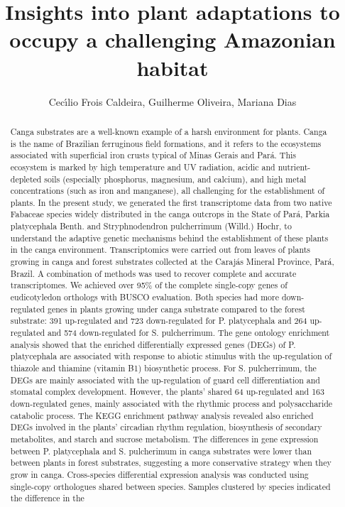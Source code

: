 \documentclass[twoside]{article}
\title{\vspace{-15mm}\fontsize{24pt}{10pt}\selectfont\textbf{ Insights into plant adaptations to occupy a challenging Amazonian habitat }} %
\author{ Cec\'{\i}lio Frois Caldeira,  Guilherme Oliveira,  Mariana Dias }
\affil{ ITV - Instituto Tecnol\'ogico Vale,  UFMG/ITV }
\date{}
\begin{document}
  
  
  \maketitle %
  
  
  \thispagestyle{fancy} %
  
  
  \begin{abstract}
  Canga substrates are a well-known example of a harsh environment for plants. Canga is the name of Brazilian ferruginous field formations,  and it refers to the ecosystems associated with superficial iron crusts typical of Minas Gerais and Par\'a. This ecosystem is marked by high temperature and UV radiation,  acidic and nutrient-depleted soils (especially phosphorus,  magnesium,  and calcium),  and high metal concentrations (such as iron and manganese),  all challenging for the establishment of plants. In the present study,  we generated the first transcriptome data from two native Fabaceae species widely distributed in the canga outcrops in the State of Par\'a,  Parkia platycephala Benth. and Stryphnodendron pulcherrimum (Willd.) Hochr,  to understand the adaptive genetic mechanisms behind the establishment of these plants in the canga environment. Transcriptomics were carried out from leaves of plants growing in canga and forest substrates collected at the Caraj\'as Mineral Province,  Par\'a,  Brazil. A combination of methods was used to recover complete and accurate transcriptomes. We achieved over 95\% of the complete single-copy genes of eudicotyledon orthologs with BUSCO evaluation. Both species had more down-regulated genes in plants growing under canga substrate compared to the forest substrate: 391 up-regulated and 723 down-regulated for P. platycephala and 264 up-regulated and 574 down-regulated for S. pulcherrimum. The gene ontology enrichment analysis showed that the enriched differentially expressed genes (DEGs) of P. platycephala are associated with response to abiotic stimulus with the up-regulation of thiazole and thiamine (vitamin B1) biosynthetic process. For S. pulcherrimum,  the DEGs are mainly associated with the up-regulation of guard cell differentiation and stomatal complex development. However,  the plants’ shared 64 up-regulated and 163 down-regulated genes,  mainly associated with the rhythmic process and polysaccharide catabolic process. The KEGG enrichment pathway analysis revealed also enriched DEGs involved in the plants’ circadian rhythm regulation,  biosynthesis of secondary metabolites,  and starch and sucrose metabolism. The differences in gene expression between P. platycephala and S. pulcherimum in canga substrates were lower than between plants in forest substrates,  suggesting a more conservative strategy when they grow in canga. Cross-species differential expression analysis was conducted using single-copy orthologues shared between species. Samples clustered by species indicated the difference in the 
\end{abstract}
\end{document}
